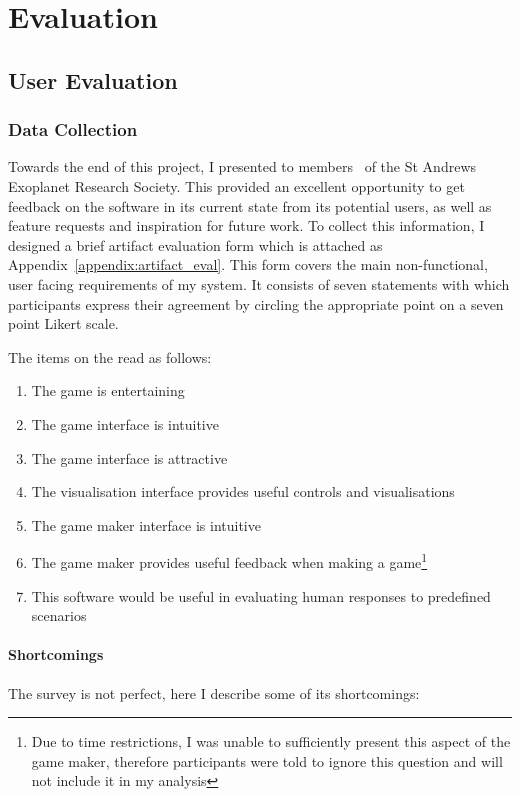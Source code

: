 \chapter{Evaluation}

\section{User Evaluation}

\subsection{Data Collection}
Towards the end of this project, I presented \od{} to members~\cite{CfESMembers} of the St Andrews Exoplanet Research Society. This provided an excellent opportunity to get feedback on the software in its current state from its potential users, as well as feature requests and inspiration for future work. To collect this information, I designed a brief artifact evaluation form which is attached as Appendix~\ref{appendix:artifact_eval}. This form covers the main non-functional, user facing requirements of my system. It consists of seven statements with which participants express their agreement by circling the appropriate point on a seven point Likert scale.

The items on the read as follows:
\begin{enumerate}[label=\textbf{it.\arabic*}]
    \item\label{i:gent} The game is entertaining
    \item\label{i:gint} The game interface is intuitive
    \item\label{i:gatt} The game interface is attractive
    \item\label{i:vis} The visualisation interface provides useful controls and visualisations
    \item\label{i:gmint} The game maker interface is intuitive
    \item\label{i:gmuse} The game maker provides useful feedback when making a game\footnote{Due to time restrictions, I was unable to sufficiently present this aspect of the game maker, therefore participants were told to ignore this question and will not include it in my analysis}
    \item\label{i:s} This software would be useful in evaluating human responses to predefined scenarios
\end{enumerate}

\subsubsection{Shortcomings}
The survey is not perfect, here I describe some of its shortcomings:

